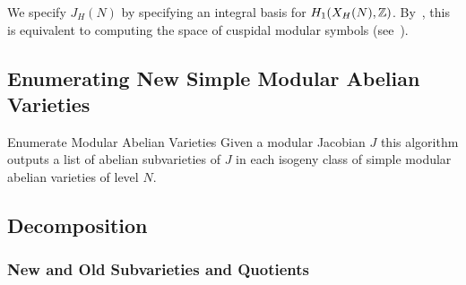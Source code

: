 \documentclass{article}
\begin{document}
We specify $J_H(N)$ by specifying an integral basis for $H_1(X_H(N), \mathbb{Z})$.
By~\cite[Theorem 1.9]{manin:parabolic}, this is equivalent to computing the
space of cuspidal modular symbols (see~\cite[\S 3]{stein:modform}).

\subsection{Enumerating New Simple Modular Abelian Varieties}

\begin{algorithm}{Enumerate Modular Abelian Varieties}
	Given a modular Jacobian $J$ this algorithm outputs a list of
	abelian subvarieties of $J$ in each isogeny class of simple modular
	abelian varieties of level $N$.
\end{algorithm}


\subsection{Decomposition}
\subsubsection{New and Old Subvarieties and Quotients}
\end{document}
